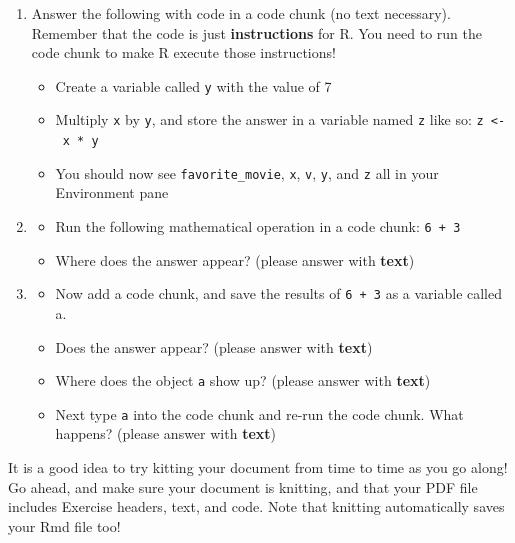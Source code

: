 \documentclass[
]{article}
\providecommand{\tightlist}{%
  \setlength{\itemsep}{0pt}\setlength{\parskip}{0pt}}
\begin{document}
\begin{enumerate}
\def\labelenumi{\arabic{enumi}.}
\item
  Answer the following with code in a code chunk (no text necessary).
  Remember that the code is just \textbf{instructions} for R. You need
  to run the code chunk to make R execute those instructions!

  \begin{itemize}
  \tightlist
  \item
    Create a variable called \texttt{y} with the value of 7
  \item
    Multiply \texttt{x} by \texttt{y}, and store the answer in a
    variable named \texttt{z} like so: \texttt{z\ \textless{}-\ x\ *\ y}
  \item
    You should now see \texttt{favorite\_movie}, \texttt{x}, \texttt{v},
    \texttt{y}, and \texttt{z} all in your Environment pane
  \end{itemize}
\item
  \begin{itemize}
  \tightlist
  \item
    Run the following mathematical operation in a code chunk:
    \texttt{6\ +\ 3}
  \item
    Where does the answer appear? (please answer with \textbf{text})
  \end{itemize}
\item
  \begin{itemize}
  \tightlist
  \item
    Now add a code chunk, and save the results of \texttt{6\ +\ 3} as a
    variable called a.
  \item
    Does the answer appear? (please answer with \textbf{text})
  \item
    Where does the object \texttt{a} show up? (please answer with
    \textbf{text})
  \item
    Next type \texttt{a} into the code chunk and re-run the code chunk.
    What happens? (please answer with \textbf{text})
  \end{itemize}
\end{enumerate}

\leavevmode\hypertarget{license}{}%
It is a good idea to try kitting your document from time to time as you
go along! Go ahead, and make sure your document is knitting, and that
your PDF file includes Exercise headers, text, and code. Note that
knitting automatically saves your Rmd file too!
\end{document}
